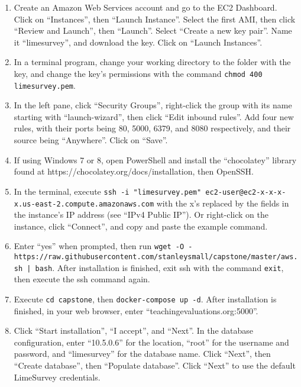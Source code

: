 \documentclass{article}
\begin{document}
\begin{enumerate}
    \item Create an Amazon Web Services account and go to the EC2 Dashboard. Click on ``Instances'', then ``Launch Instance''. Select the first AMI, then click ``Review and Launch'', then ``Launch''. Select ``Create a new key pair''. Name it ``limesurvey'', and download the key. Click on ``Launch Instances''.

    \item In a terminal program, change your working directory to the folder with the key, and change the key's permissions with the command \verb|chmod 400 limesurvey.pem|.

    \item In the left pane, click ``Security Groups'', right-click the group with its name starting with ``launch-wizard'', then click ``Edit inbound rules''. Add four new rules, with their ports being 80, 5000, 6379, and 8080 respectively, and their source being ``Anywhere''. Click on ``Save''.
    
    \item If using Windows 7 or 8, open PowerShell and install the ``chocolatey'' library found at \newline https://chocolatey.org/docs/installation, then OpenSSH.

    \item In the terminal, execute \verb|ssh -i "limesurvey.pem" ec2-user@ec2-x-x-x-x.us-east-2.compute|\newline\verb|.amazonaws.com| with the x’s replaced by the fields in the instance’s IP address (see ``IPv4 Public IP''). Or right-click on the instance, click ``Connect'', and copy and paste the example command.

    \item Enter ``yes'' when prompted, then run \verb+wget -O - https://raw.githubusercontent.com+\newline\verb+/stanleysmall/capstone/master/aws.sh | bash+. After installation is finished, exit ssh with the command \verb|exit|, then execute the ssh command again.

    \item Execute \verb|cd capstone|, then \verb|docker-compose up -d|. After installation is finished, in your web \newline browser, enter ``teachingevaluations.org:5000''.

    \item Click ``Start installation'', ``I accept'', and ``Next''. In the database configuration, enter ``10.5.0.6'' for the location, ``root'' for the username and password, and ``limesurvey'' for the database name. Click ``Next'', then ``Create database'', then ``Populate database''. Click ``Next'' to use the default LimeSurvey credentials.


\end{enumerate}
\end{document}
